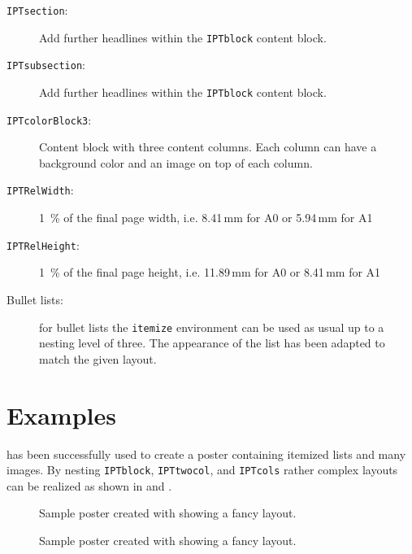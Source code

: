 \begin{description}
	\item[\texttt{\bs{}IPTsection}:] Add further headlines within the \texttt{\bs{}IPTblock} content block.

	\item[\texttt{\bs{}IPTsubsection}:] Add further headlines within the \texttt{\bs{}IPTblock} content block.

	\item[\texttt{IPTcolorBlock3}:] Content block with three content columns. Each column can have a background color and an image on top of each column.

	\item[\texttt{IPTRelWidth}:] 1~\% of the final page width, i.e. 8.41\,mm for A0 or 5.94\,mm for A1

	\item[\texttt{IPTRelHeight}:] 1~\% of the final page height, i.e. 11.89\,mm for A0 or 8.41\,mm for A1

	\item[Bullet lists:] for bullet lists the \texttt{itemize} environment can be used as usual up to a nesting level of three. The appearance of the list has been adapted to match the given layout.

\end{description}


\section{Examples}

\tugPoster{} has been successfully used to create a poster containing itemized lists and many images. By nesting \texttt{IPTblock}, \texttt{IPTtwocol}, and \texttt{IPTcols} rather complex layouts can be realized as shown in  and .

\begin{figure}
\centering
\caption{Sample poster created with \tugPoster{} showing a fancy layout.}
\label{fig:sample_poster1}
\end{figure}

\begin{figure}
\centering
\caption{Sample poster created with \tugPoster{} showing a fancy layout.}
\label{fig:sample_poster2}
\end{figure}

